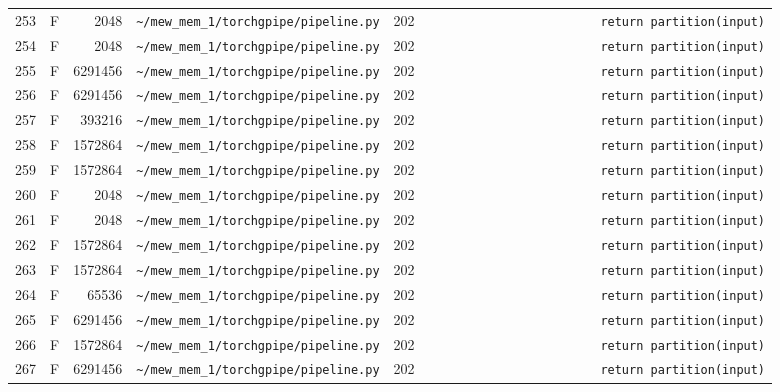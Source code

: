\documentclass{article}
\begin{document}
\begin{longtable}{r l r p{6.5cm} r p{7.0cm}}
253 & F & 2048 & \lstinline|~/mew_mem_1/torchgpipe/pipeline.py| & 202 & \lstinline|                        return partition(input)| \\
254 & F & 2048 & \lstinline|~/mew_mem_1/torchgpipe/pipeline.py| & 202 & \lstinline|                        return partition(input)| \\
255 & F & 6291456 & \lstinline|~/mew_mem_1/torchgpipe/pipeline.py| & 202 & \lstinline|                        return partition(input)| \\
256 & F & 6291456 & \lstinline|~/mew_mem_1/torchgpipe/pipeline.py| & 202 & \lstinline|                        return partition(input)| \\
257 & F & 393216 & \lstinline|~/mew_mem_1/torchgpipe/pipeline.py| & 202 & \lstinline|                        return partition(input)| \\
258 & F & 1572864 & \lstinline|~/mew_mem_1/torchgpipe/pipeline.py| & 202 & \lstinline|                        return partition(input)| \\
259 & F & 1572864 & \lstinline|~/mew_mem_1/torchgpipe/pipeline.py| & 202 & \lstinline|                        return partition(input)| \\
260 & F & 2048 & \lstinline|~/mew_mem_1/torchgpipe/pipeline.py| & 202 & \lstinline|                        return partition(input)| \\
261 & F & 2048 & \lstinline|~/mew_mem_1/torchgpipe/pipeline.py| & 202 & \lstinline|                        return partition(input)| \\
262 & F & 1572864 & \lstinline|~/mew_mem_1/torchgpipe/pipeline.py| & 202 & \lstinline|                        return partition(input)| \\
263 & F & 1572864 & \lstinline|~/mew_mem_1/torchgpipe/pipeline.py| & 202 & \lstinline|                        return partition(input)| \\
264 & F & 65536 & \lstinline|~/mew_mem_1/torchgpipe/pipeline.py| & 202 & \lstinline|                        return partition(input)| \\
265 & F & 6291456 & \lstinline|~/mew_mem_1/torchgpipe/pipeline.py| & 202 & \lstinline|                        return partition(input)| \\
266 & F & 1572864 & \lstinline|~/mew_mem_1/torchgpipe/pipeline.py| & 202 & \lstinline|                        return partition(input)| \\
267 & F & 6291456 & \lstinline|~/mew_mem_1/torchgpipe/pipeline.py| & 202 & \lstinline|                        return partition(input)| \\

\end{longtable}
\end{document}
